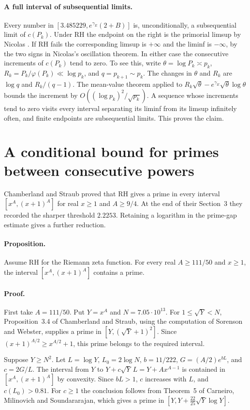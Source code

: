 \documentclass[11pt,a4paper]{article}
\begin{document}
\paragraph{A full interval of subsequential limits.}
Every number in $[3.485229,e^{\gamma_E}(2+B)]$ is, unconditionally,
a subsequential limit of $c(P_k)$. Under RH the endpoint on the right
is the primorial limsup by Nicolas \cite[Section 4]{nic}. If RH fails
the corresponding limsup is $+\infty$ and the liminf is $-\infty$,
by the two signs in Nicolas's oscillation theorem. In either case
the consecutive increments of $c(P_k)$ tend to zero. To see this, write
$\theta=\log P_k\asymp p_k$, $R_k=P_k/\varphi(P_k)\ll\log p_k$,
and $q=p_{k+1}\sim p_k$. The changes in $\theta$ and $R_k$ are
$\log q$ and $R_k/(q-1)$. The mean-value theorem applied to
$R_k\sqrt{\theta}-e^{\gamma_E}\sqrt{\theta}\log\theta$ bounds the
increment by $O((\log p_k)^2/\sqrt{p_k})$. A sequence whose increments
tend to zero visits every interval separating its liminf from its
limsup infinitely often, and finite endpoints are subsequential limits.
This proves the claim.

\section{A conditional bound for primes between consecutive powers}
Chamberland and Straub \cite{chstr} proved that RH gives a prime in every interval
$[x^A,(x+1)^A]$ for real $x\ge1$ and $A\ge 9/4$. At the end
of their Section~3 they recorded the sharper threshold $2.2253$.
Retaining a logarithm in the prime-gap estimate gives a further reduction.

\paragraph{Proposition.} Assume RH for the Riemann zeta function. For every real
$A\ge 111/50$ and $x\ge1$, the interval $[x^A,(x+1)^A]$ contains a prime.

\paragraph{Proof.} First take $A=111/50$. Put $Y=x^A$ and
$N=7.05\cdot10^{13}$. For $1\le\sqrt Y<N$, Proposition~3.4 of Chamberland and
Straub, using the computation of Sorenson and Webster, supplies a prime in
$[Y,(\sqrt Y+1)^2]$. Since $(x+1)^{A/2}\ge x^{A/2}+1$, this prime belongs
to the required interval.

Suppose $Y\ge N^2$. Let $L=\log Y$, $L_0=2\log N$, $b=11/222$,
$G=(A/2)e^{bL}$, and $c=2G/L$. The interval from $Y$ to
$Y+c\sqrt Y\,L=Y+Ax^{A-1}$ is contained in $[x^A,(x+1)^A]$ by convexity.
Since $bL>1$, $c$ increases with $L$, and $c(L_0)>0.81$. For $c\ge1$ the
conclusion follows from Theorem~5 of Carneiro, Milinovich and Soundararajan,
which gives a prime in $[Y,Y+\frac{22}{25}\sqrt Y\log Y]$.
\end{document}
